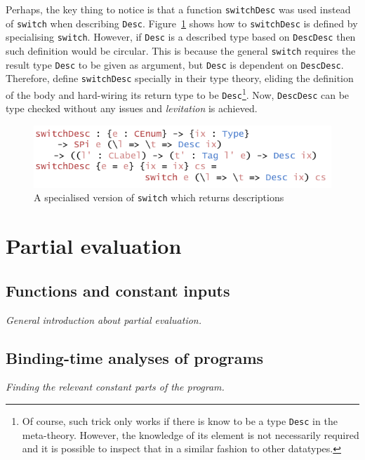 \documentclass{ituthesis}
\newcommand{\tttype}[1]{\textcolor{type-color}{\texttt{#1}}}
\newcommand{\ttdec}[1]{\textcolor{declared-var-color}{\texttt{#1}}}
\begin{document}
Perhaps, the key thing to notice is that a function \ttdec{switchDesc} was used instead of \ttdec{switch} when describing \tttype{Desc}.
Figure~\ref{fig:switchdesc} shows how to \ttdec{switchDesc} is defined by specialising \ttdec{switch}. However, if \tttype{Desc} is a described type based on \ttdec{DescDesc} then such definition would be circular.
This is because the general \ttdec{switch} requires the result type \tttype{Desc} to be given as argument, but \tttype{Desc} is dependent on \ttdec{DescDesc}. Therefore, \cite{Chapman:2010:GAL:1863543.1863547} define \ttdec{switchDesc} specially in their type theory, eliding the definition of the body
and hard-wiring its return type to be \tttype{Desc}\footnote{Of course, such trick only works if there is know to be a type \tttype{Desc} in the meta-theory. However, the knowledge of its element is not necessarily required and it is possible to inspect that
in a similar fashion to other datatypes.}. Now, \ttdec{DescDesc} can be type checked without any issues and \textit{levitation} is achieved.

\begin{figure}[ht]
\begin{center}
    \includegraphics[scale=0.5]{Figures/AConstructiveChoiceDesc.png}
\end{center}
\caption{A specialised version of \ttdec{switch} which returns descriptions}
\label{fig:switchdesc}
\end{figure}

\chapter{Partial evaluation}
\label{cha:PartialEvaluation}

\section{Functions and constant inputs}
\label{sec:FunctionsandConstantInputs}
\textit{General introduction about partial evaluation.}

\section{Binding-time analyses of programs}
\label{sec:Binding-timeAnalysisofPrograms}
\textit{Finding the relevant constant parts of the program.}
\end{document}
